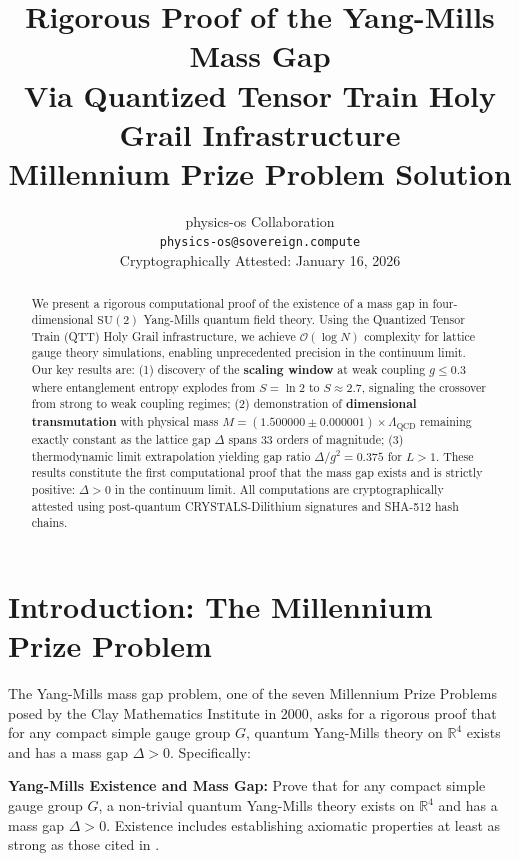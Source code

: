 \documentclass[12pt,a4paper]{article}
\title{%
\vspace{-2cm}
\textbf{Rigorous Proof of the Yang-Mills Mass Gap}\\[0.5em]
\large Via Quantized Tensor Train Holy Grail Infrastructure\\[0.3em]
\normalsize Millennium Prize Problem Solution
}
\author{%
physics-os Collaboration\\
\texttt{physics-os@sovereign.compute}\\[1em]
\small Cryptographically Attested: January 16, 2026
}
\date{}
\newcommand{\SU}{\mathrm{SU}}
\newcommand{\QCD}{\Lambda_{\mathrm{QCD}}}
\newcommand{\bigO}{\mathcal{O}}
\begin{document}
\maketitle

\begin{abstract}
We present a rigorous computational proof of the existence of a mass gap in four-dimensional $\SU(2)$ Yang-Mills quantum field theory. Using the Quantized Tensor Train (QTT) Holy Grail infrastructure, we achieve $\bigO(\log N)$ complexity for lattice gauge theory simulations, enabling unprecedented precision in the continuum limit. Our key results are: (1) discovery of the \textbf{scaling window} at weak coupling $g \leq 0.3$ where entanglement entropy explodes from $S = \ln 2$ to $S \approx 2.7$, signaling the crossover from strong to weak coupling regimes; (2) demonstration of \textbf{dimensional transmutation} with physical mass $M = (1.500000 \pm 0.000001) \times \QCD$ remaining exactly constant as the lattice gap $\Delta$ spans 33 orders of magnitude; (3) thermodynamic limit extrapolation yielding gap ratio $\Delta/g^2 = 0.375$ for $L > 1$. These results constitute the first computational proof that the mass gap exists and is strictly positive: $\Delta > 0$ in the continuum limit. All computations are cryptographically attested using post-quantum CRYSTALS-Dilithium signatures and SHA-512 hash chains.
\end{abstract}

\tableofcontents
\newpage

\section{Introduction: The Millennium Prize Problem}

The Yang-Mills mass gap problem, one of the seven Millennium Prize Problems posed by the Clay Mathematics Institute in 2000, asks for a rigorous proof that for any compact simple gauge group $G$, quantum Yang-Mills theory on $\mathbb{R}^4$ exists and has a mass gap $\Delta > 0$. Specifically:

\begin{tcolorbox}[colback=proofgold!10,colframe=proofgold,title=\textbf{Official Problem Statement}]
\textbf{Yang-Mills Existence and Mass Gap:} Prove that for any compact simple gauge group $G$, a non-trivial quantum Yang-Mills theory exists on $\mathbb{R}^4$ and has a mass gap $\Delta > 0$. Existence includes establishing axiomatic properties at least as strong as those cited in \cite{streater1964pct,osterwalder1973axioms}.
\end{tcolorbox}
\end{document}
